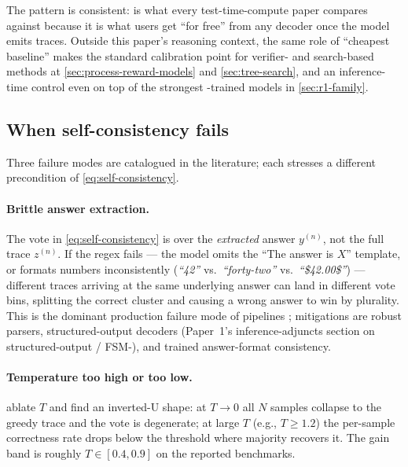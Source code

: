 The pattern is consistent:  is what every
test-time-compute paper compares against because it is what users get
``for free'' from any decoder once the model emits  traces. Outside
this paper's reasoning context, the same role of ``cheapest baseline''
makes  the standard calibration point for verifier-
and search-based methods at \cref{sec:process-reward-models} and
\cref{sec:tree-search}, and an inference-time control even on top of
the strongest -trained models in \cref{sec:r1-family}.

\subsection{When self-consistency fails}
\label{sec:sc-when-fails}

Three failure modes are catalogued in the literature; each stresses a
different precondition of \cref{eq:self-consistency}.

\paragraph{Brittle answer extraction.} The vote in
\cref{eq:self-consistency} is over the \emph{extracted} answer
$y^{(n)}$, not the full trace $z^{(n)}$. If the regex fails — the
model omits the ``The answer is $X$'' template, or formats numbers
inconsistently (\textit{``42''} vs.\ \textit{``forty-two''} vs.\
\textit{``\$42.00\$''}) — different traces arriving at the same
underlying answer can land in different vote bins, splitting the
correct cluster and causing a wrong answer to win by plurality. This
is the dominant production failure mode of  pipelines
\citep[\S 2.4]{wang2022-self-consistency}; mitigations are robust
parsers, structured-output decoders (Paper~1's inference-adjuncts
section on structured-output / FSM-), and
trained answer-format consistency.

\paragraph{Temperature too high or too low.}
\citet[\S 4.3]{wang2022-self-consistency} ablate $T$ and find an
inverted-U shape: at $T \to 0$ all $N$ samples collapse to the
greedy trace and the vote is degenerate; at large $T$ (e.g.,
$T \ge 1.2$) the per-sample correctness rate drops below the
threshold where majority recovers it. The gain band is roughly
$T \in [0.4, 0.9]$ on the reported benchmarks.

